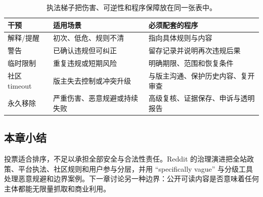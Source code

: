 \begin{table}[H]
\centering
\begin{tabular}{L{0.18\textwidth}L{0.27\textwidth}L{0.43\textwidth}}
\toprule
干预 & 适用场景 & 必须配套的程序 \\
\midrule
解释/提醒 & 初次、低危、规则不清 & 指向具体规则与内容 \\
警告 & 已确认违规但可纠正 & 留存记录并说明再次违规后果 \\
临时限制 & 重复违规或短期风险 & 明确期限、范围和恢复条件 \\
社区 timeout & 版主失去控制或冲突升级 & 与版主沟通、保护历史内容、复开审查 \\
永久移除 & 严重伤害、恶意规避或持续失败 & 高级复核、证据保存、申诉与透明报告 \\
\bottomrule
\end{tabular}
\caption{执法梯子把伤害、可逆性和程序保障放在同一张表中。}
\end{table}

\subsection{本章小结}

投票适合排序，不足以承担全部安全与合法性责任。Reddit 的治理演进把全站政策、平台执法、社区规则和用户参与分层，并用 ``specifically vague'' 与分级工具处理恶意规避和边界案例。下一章讨论另一种边界：公开可读内容是否意味着任何主体都能无限量抓取和商业利用。

